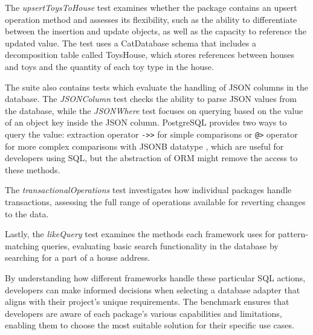 The \textit{upsertToysToHouse} test examines whether the package contains an
upsert operation method and assesses its flexibility, such as the ability to
differentiate between the insertion and update objects, as well as the capacity
to reference the updated value. The test uses a CatDatabase schema that includes
a decomposition table called ToysHouse, which stores references between houses
and toys and the quantity of each toy type in the house.

The suite also contains tests which evaluate the handling of JSON columns in the
database. The \textit{JSONColumn} test checks the ability to parse JSON values
from the database, while the \textit{JSONWhere} test focuses on querying based
on the value of an object key inside the JSON column. PostgreSQL provides two
ways to query the value: extraction operator \texttt{->>} for simple comparisons
or \texttt{@>} operator for more complex comparisons with JSONB datatype
\cite{postgres-json}, which are useful for developers using SQL, but the
abstraction of ORM might remove the access to these methods.

The \textit{transactionalOperations} test investigates how individual packages
handle transactions, assessing the full range of operations available for
reverting changes to the data.

Lastly, the \textit{likeQuery} test examines the methods each framework uses for
pattern-matching queries, evaluating basic search functionality in the database
by searching for a part of a house address.

By understanding how different frameworks handle these particular SQL actions,
developers can make informed decisions when selecting a database adapter that
aligns with their project's unique requirements. The benchmark ensures that
developers are aware of each package's various capabilities and limitations,
enabling them to choose the most suitable solution for their specific use cases.